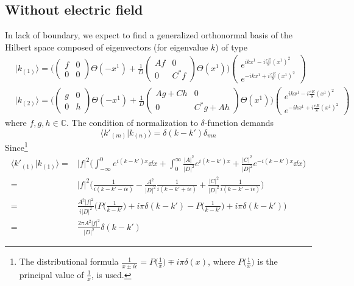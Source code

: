 \subsection{Without electric field}\label{sect-nbnef}
In lack of boundary, we expect to find a generalized orthonormal basis of the Hilbert space composed of eigenvectors (for eigenvalue $k$) of type
\begin{equation}
\begin{split}
& | k_{(1)} \rangle = \bigg( \begin{pmatrix} f & 0 \\ 0 & 0 \end{pmatrix}
\Theta(-x^1) + 
\frac{1}{D}\begin{pmatrix} Af & 0 \\  0 & C^* f \end{pmatrix} \Theta(x^1) \bigg)
\begin{pmatrix} e^{ikx^1-i\frac{eE}{8}(x^1)^2}  \\ e^{-ikx^1+i\frac{eE}{8}(x^1)^2} \end{pmatrix}   \\
& | k_{(2)} \rangle = \bigg( \begin{pmatrix} g& 0 \\ 0 & h \end{pmatrix}
\Theta(-x^1) + 
\frac{1}{D}\begin{pmatrix} Ag + Ch  & 0\\ 0&  C^*g + Ah  \end{pmatrix} \Theta(x^1) \bigg)
\begin{pmatrix} e^{ikx^1-i\frac{eE}{8}(x^1)^2}  \\  e^{-ikx^1+i\frac{eE}{8}(x^1)^2}  \end{pmatrix}  
\end{split}
\end{equation}
where $f,g,h \in \mathbb{C}$.
The condition of normalization to $\delta$-function demands
\begin{equation}
\langle k'_{(m)} | k_{(n)} \rangle = \delta(k - k') \delta_{mn}
\end{equation}
Since\footnote{
The distributional formula $\frac{1}{x \pm i\epsilon} = P\big(\frac{1}{x}\big) \mp i\pi\delta(x)$, where $P\big(\frac{1}{x}\big)$ is the principal value of $\frac{1}{x}$, is used.}
\begin{equation}
\begin{split}
\langle k'_{(1)} | k_{(1)} \rangle = & |f|^2 \bigg( \int_{-\infty}^0 e^{i(k - k')x} \dd x + \int_0^{\infty}\frac{|A|^2}{|D|^2} e^{i(k-k')x} + \frac{|C|^2}{|D|^2} e^{-i(k - k')x} \dd x \bigg) \\
= & |f|^2 \bigg( \frac{1}{i(k-k' - i\epsilon)} - \frac{A^2}{|D|^2}\frac{1}{i(k-k'+i\epsilon)} + \frac{|C|^2}{|D|^2}\frac{1}{i(k-k'-i\epsilon)} \bigg) \\
= & \frac{A^2 |f|^2}{i |D|^2}\Big( P\big(\frac{1}{k-k'}\big) + i\pi \delta(k-k') - P\big(\frac{1}{k-k'}\big) + i\pi \delta(k-k') \Big) \\
= & \frac{2\pi A^2 |f|^2}{|D|^2} \delta(k-k')
\end{split}
\end{equation}
